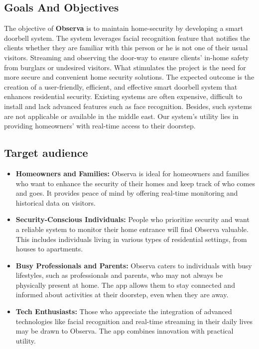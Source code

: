 \documentclass[a4 paper, 12pt]{article}
\begin{document}
\subsection{Goals And Objectives}
The objective of \textbf{Observa} is to maintain home-security by developing a smart doorbell system. The system leverages facial recognition feature that notifies the clients whether they are familiar with this person or he is not one of their usual visitors. Streaming and observing the door-way to ensure clients' in-home safety from burglars or undesired visitors. What stimulates the project is the need for more secure and convenient home security solutions. The expected outcome is the creation of a user-friendly, efficient, and effective smart doorbell system that enhances residential security. Existing systems are often expensive, difficult to install and lack advanced features such as face recognition. Besides, such systems are not applicable or available in the middle east. Our system's utility lies in providing homeowners' with real-time access to their doorstep.\
\subsection{Target audience}
\begin{itemize}
    \item \textbf{Homeowners and Families:} Observa is ideal for homeowners and families who want to enhance the security of their homes and keep track of who comes and goes. It provides peace of mind by offering real-time monitoring and historical data on visitors.
    
    \item \textbf{Security-Conscious Individuals:} People who prioritize security and want a reliable system to monitor their home entrance will find Observa valuable. This includes individuals living in various types of residential settings, from houses to apartments.
    
    \item \textbf{Busy Professionals and Parents:} Observa caters to individuals with busy lifestyles, such as professionals and parents, who may not always be physically present at home. The app allows them to stay connected and informed about activities at their doorstep, even when they are away.
    
    \item \textbf{Tech Enthusiasts:} Those who appreciate the integration of advanced technologies like facial recognition and real-time streaming in their daily lives may be drawn to Observa. The app combines innovation with practical utility.
\end{itemize}
\end{document}
